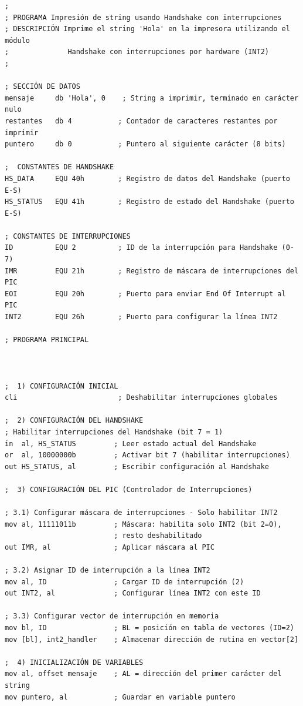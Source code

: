 \documentclass[12pt,oneside]{templates/unerthesis}
\begin{document}
\begin{lstlisting}
; 
; PROGRAMA Impresión de string usando Handshake con interrupciones
; DESCRIPCIÓN Imprime el string 'Hola' en la impresora utilizando el módulo
;              Handshake con interrupciones por hardware (INT2)
; 

; SECCIÓN DE DATOS 
mensaje     db 'Hola', 0    ; String a imprimir, terminado en carácter nulo
restantes   db 4           ; Contador de caracteres restantes por imprimir
puntero     db 0           ; Puntero al siguiente carácter (8 bits)

;  CONSTANTES DE HANDSHAKE 
HS_DATA     EQU 40h        ; Registro de datos del Handshake (puerto E-S)
HS_STATUS   EQU 41h        ; Registro de estado del Handshake (puerto E-S)

; CONSTANTES DE INTERRUPCIONES 
ID          EQU 2          ; ID de la interrupción para Handshake (0-7)
IMR         EQU 21h        ; Registro de máscara de interrupciones del PIC
EOI         EQU 20h        ; Puerto para enviar End Of Interrupt al PIC
INT2        EQU 26h        ; Puerto para configurar la línea INT2

; PROGRAMA PRINCIPAL



;  1) CONFIGURACIÓN INICIAL 
cli                        ; Deshabilitar interrupciones globales

;  2) CONFIGURACIÓN DEL HANDSHAKE
; Habilitar interrupciones del Handshake (bit 7 = 1)
in  al, HS_STATUS         ; Leer estado actual del Handshake
or  al, 10000000b         ; Activar bit 7 (habilitar interrupciones)
out HS_STATUS, al         ; Escribir configuración al Handshake

;  3) CONFIGURACIÓN DEL PIC (Controlador de Interrupciones)

; 3.1) Configurar máscara de interrupciones - Solo habilitar INT2
mov al, 11111011b         ; Máscara: habilita solo INT2 (bit 2=0),
                          ; resto deshabilitado
out IMR, al               ; Aplicar máscara al PIC

; 3.2) Asignar ID de interrupción a la línea INT2
mov al, ID                ; Cargar ID de interrupción (2)
out INT2, al              ; Configurar línea INT2 con este ID

; 3.3) Configurar vector de interrupción en memoria
mov bl, ID                ; BL = posición en tabla de vectores (ID=2)
mov [bl], int2_handler    ; Almacenar dirección de rutina en vector[2]

;  4) INICIALIZACIÓN DE VARIABLES 
mov al, offset mensaje    ; AL = dirección del primer carácter del string
mov puntero, al           ; Guardar en variable puntero


\end{lstlisting}
\end{document}

